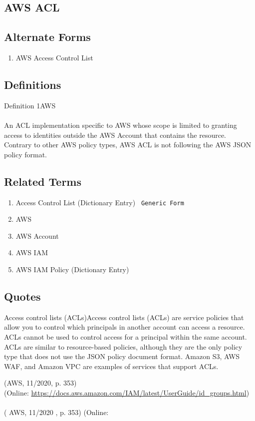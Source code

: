 \newpage \subsection*{AWS ACL } \subsection*{Alternate Forms } \begin{enumerate} \item  AWS Access Control List  \end{enumerate} \subsection*{Definitions } \begin{DIC_Def}{Definition 1AWS }{} \paragraph{} An ACL implementation specific to AWS whose scope is limited to granting access to identities outside the AWS Account that contains the resource. Contrary to other AWS policy types, AWS ACL is not following the AWS JSON policy format.  \end{DIC_Def} \subsection*{Related Terms } \begin{enumerate} \item  Access Control List (Dictionary Entry)    \texttt{ Generic Form  } \item  AWS  \item  AWS Account  \item  AWS IAM  \item  AWS IAM Policy (Dictionary Entry)    \end{enumerate} \subsection*{Quotes } \begin{DIC_BlockQuote} Access control lists (ACLs)Access control lists (ACLs) are service policies that allow you to control which principals in another account can access a resource. ACLs cannot be used to control access for a principal within the same account. ACLs are similar to resource-based policies, although they are the only policy type that does not use the JSON policy document format. Amazon S3, AWS WAF, and Amazon VPC are examples of services that support ACLs.  \end{DIC_BlockQuote} (AWS, 11/2020, p. 353)\\ (Online: \url{https://docs.aws.amazon.com/IAM/latest/UserGuide/id_groups.html})  \paragraph{} (  AWS, 11/2020  , p. 353)  (Online:  
